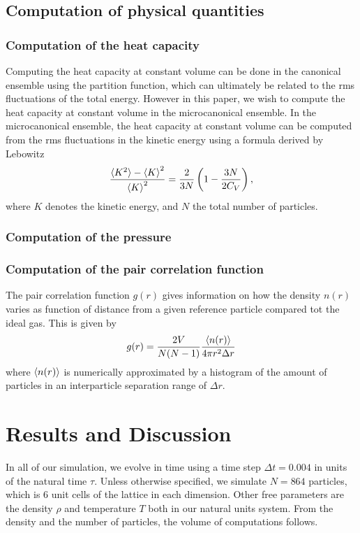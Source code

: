 \documentclass[twoside]{article}
\begin{document}
\subsection{Computation of physical quantities}
\subsubsection*{Computation of the heat capacity}
Computing the heat capacity at constant volume can be done in the canonical ensemble using the partition function, which can ultimately be related to the rms fluctuations of the total energy. However in this paper, we wish to compute the heat capacity at constant volume in the microcanonical ensemble. In the microcanonical ensemble, the heat capacity at constant volume can be computed from the rms fluctuations in the kinetic energy using a formula derived by Lebowitz\cite{ref_Lebowitz}
\begin{equation}
\frac{\braket{K^2} - \braket{K}^2}{\braket{K}^2} = \frac{2}{3N} \left( 1 - \frac{3N}{2C_V} \right),
\label{eq_Lebowitz}
\end{equation}
where $K$ denotes the kinetic energy, and $N$ the total number of particles. 
\subsubsection* {Computation of the pressure}
\subsubsection* {Computation of the pair correlation function}
The pair correlation function $g(r)$  gives information on how the density $n(r)$ varies as function of distance from a given reference particle compared tot the ideal gas. This is given by 
\begin{equation}\label{eq_correlation}
g(r) = \frac{2V}{N(N-1)}\frac{\braket{n(r)}}{4\pi r^2 \Delta r}
\end{equation}
where $\braket{n(r)}$ is numerically approximated by a histogram of the amount of particles in an interparticle separation range of $\Delta r$. 


\section{Results and Discussion}
In all of our simulation, we evolve in time using a time step $\Delta t = 0.004$ in units of the natural time $\tau$. Unless otherwise specified, we simulate $N = 864$ particles, which is 6 unit cells of the lattice in each dimension. Other free parameters are the density $\rho$ and temperature $T$ both in our natural units system. From the density and the number of particles, the volume of computations follows.
\end{document}
